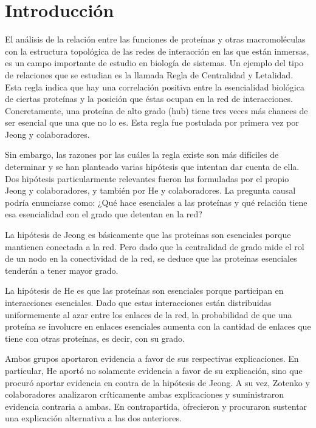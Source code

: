 \documentclass[%
 reprint,
 amsmath,amssymb,
 aps,
]{revtex4-1}
\begin{document}

\section{Introducci\'on}

El an\'alisis de la relaci\'on entre las funciones de prote\'inas y otras macromol\'eculas con la estructura topol\'ogica de las redes de interacci\'on en las que est\'an inmersas, es un campo importante de estudio en biolog\'ia de sistemas. Un ejemplo del tipo de relaciones que se estudian es la llamada Regla de Centralidad y Letalidad. Esta regla indica que hay una correlaci\'on positiva entre la esencialidad biol\'ogica de ciertas prote\'inas y la posici\'on que \'estas ocupan en la red de interacciones. Concretamente, una prote\'ina de alto grado (hub) tiene tres veces m\'as chances de ser esencial que una que no lo es. Esta regla fue postulada por primera vez por Jeong y colaboradores. 

Sin embargo, las razones por las cu\'ales la regla existe son m\'as dif\'iciles de determinar y se han planteado varias hip\'otesis que intentan dar cuenta de ella. Dos hip\'otesis particularmente relevantes fueron las formuladas por el propio Jeong y colaboradores, y tambi\'en por He y colaboradores. La pregunta causal podr\'ia enunciarse como: ¿Qu\'e hace esenciales a las prote\'inas y qu\'e relaci\'on tiene esa esencialidad con el grado que detentan en la red?

La hip\'otesis de Jeong es b\'asicamente que las prote\'inas son esenciales porque mantienen conectada a la red. Pero dado que la centralidad de grado mide el rol de un nodo en la conectividad de la red, se deduce que las prote\'inas esenciales tender\'an a tener mayor grado.

La hip\'otesis de He es que las prote\'inas son esenciales porque participan en interacciones esenciales. Dado que estas interacciones est\'an distribuidas uniformemente al azar entre los enlaces de la red, la probabilidad de que una prote\'ina se involucre en enlaces esenciales aumenta con la cantidad de enlaces que tiene con otras prote\'inas, es decir, con su grado.

Ambos grupos aportaron evidencia a favor de sus respectivas explicaciones. En particular, He aport\'o no solamente evidencia a favor de su explicaci\'on, sino que procur\'o aportar evidencia en contra de la hip\'otesis de Jeong. A su vez, Zotenko y colaboradores analizaron cr\'iticamente ambas explicaciones y suministraron evidencia contraria a ambas. En contrapartida, ofrecieron y procuraron sustentar una explicaci\'on alternativa a las dos anteriores.
\end{document}
